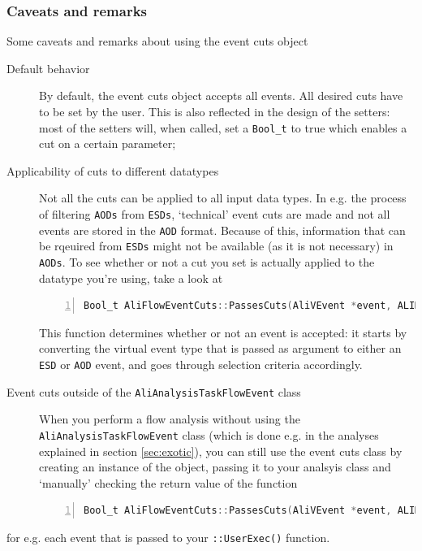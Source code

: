 \documentclass[a4paper]{book}
\numberwithin{equation}{subsection}
\begin{document}
\subsubsection{Caveats and remarks}  
Some caveats and remarks about using the event cuts object
\begin{description}
\item[Default behavior] By default, the event cuts object accepts all events. All desired cuts have to be set by the user. This is also reflected in the design of the setters: most of the setters will, when called, set a \texttt{Bool\_t} to true which enables a cut on a certain parameter;
\item[Applicability of cuts to different datatypes] Not all the cuts can be applied to all input data types. In e.g. the process of filtering \texttt{AODs} from \texttt{ESDs}, `technical' event cuts are made and not all events are stored in the \texttt{AOD} format. Because of this, information that can be rqeuired from \texttt{ESDs} might not be available (as it is not necessary) in \texttt{AODs}. To see whether or not a cut you set is actually applied to the datatype you're using, take a look at
\begin{lstlisting}[language=C, numbers=left]
Bool_t AliFlowEventCuts::PassesCuts(AliVEvent *event, ALIMCEvent *mcevent)\end{lstlisting}
This function determines whether or not an event is accepted: it starts by converting the virtual event type that is passed as argument to either an \texttt{ESD} or \texttt{AOD} event, and goes through selection criteria accordingly. 
\item[Event cuts outside of the \texttt{AliAnalysisTaskFlowEvent} class]
When you perform a flow analysis without using the \texttt{AliAnalysisTaskFlowEvent} class (which is done e.g. in the analyses explained in section \ref{sec:exotic}), you can still use the event cuts class by creating an instance of the object, passing it to your analsyis class and `manually' checking the return value of the function 
\begin{lstlisting}[language=C, numbers=left]
Bool_t AliFlowEventCuts::PassesCuts(AliVEvent *event, ALIMCEvent *mcevent)\end{lstlisting}
\end{description}
for e.g. each event that is passed to your \texttt{::UserExec()} function.
\end{document}
